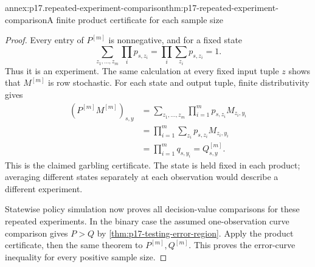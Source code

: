 \begin{annexitem}{annex:p17.repeated-experiment-comparison}{thm:p17-repeated-experiment-comparison}{A finite product certificate for each sample size}
\begin{proof}
Every entry of \(P^{[m]}\) is nonnegative, and for a fixed state
\[
                    \sum_{z_1,\ldots,z_m}\prod_i p_{s,z_i}
                            =\prod_i\sum_{z_i}p_{s,z_i}=1.
\]
Thus it is an experiment. The same calculation at every fixed input
tuple \(z\) shows that \(M^{[m]}\) is row stochastic.
For each state and output tuple, finite distributivity gives
\[
 \begin{aligned}
 (P^{[m]}M^{[m]})_{s,y}
   &=\sum_{z_1,\ldots,z_m}\prod_{i=1}^m
                              p_{s,z_i}M_{z_i,y_i}\\
   &=\prod_{i=1}^m\sum_{z_i}p_{s,z_i}M_{z_i,y_i}\\
   &=\prod_{i=1}^m q_{s,y_i}=Q^{[m]}_{s,y}.
 \end{aligned}
\]
This is the claimed garbling certificate. The state is held fixed in
each product; averaging different states separately at each observation
would describe a different experiment.

Statewise policy simulation now proves all decision-value comparisons
for these repeated experiments. In the binary case the assumed
one-observation curve comparison gives \(P>Q\) by
\cref{thm:p17-testing-error-region}. Apply the product certificate,
then the same theorem to \(P^{[m]},Q^{[m]}\).
This proves the error-curve inequality for every positive sample size.
\end{proof}
\end{annexitem}

